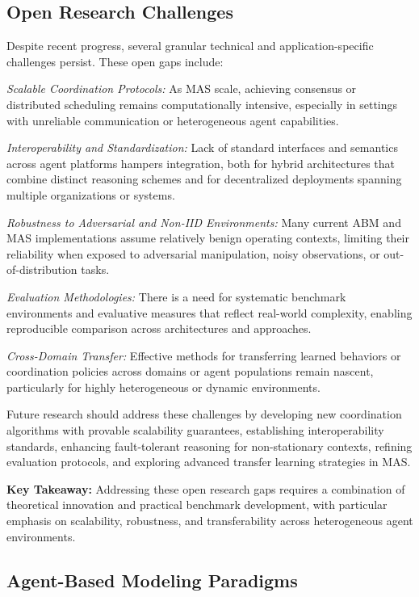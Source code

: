 \documentclass[sigconf]{acmart}
\begin{document}
\subsection{Open Research Challenges}

Despite recent progress, several granular technical and application-specific challenges persist. These open gaps include:

\textit{Scalable Coordination Protocols:} As MAS scale, achieving consensus or distributed scheduling remains computationally intensive, especially in settings with unreliable communication or heterogeneous agent capabilities.

\textit{Interoperability and Standardization:} Lack of standard interfaces and semantics across agent platforms hampers integration, both for hybrid architectures that combine distinct reasoning schemes and for decentralized deployments spanning multiple organizations or systems.

\textit{Robustness to Adversarial and Non-IID Environments:} Many current ABM and MAS implementations assume relatively benign operating contexts, limiting their reliability when exposed to adversarial manipulation, noisy observations, or out-of-distribution tasks.

\textit{Evaluation Methodologies:} There is a need for systematic benchmark environments and evaluative measures that reflect real-world complexity, enabling reproducible comparison across architectures and approaches.

\textit{Cross-Domain Transfer:} Effective methods for transferring learned behaviors or coordination policies across domains or agent populations remain nascent, particularly for highly heterogeneous or dynamic environments.

Future research should address these challenges by developing new coordination algorithms with provable scalability guarantees, establishing interoperability standards, enhancing fault-tolerant reasoning for non-stationary contexts, refining evaluation protocols, and exploring advanced transfer learning strategies in MAS.

\textbf{Key Takeaway:} Addressing these open research gaps requires a combination of theoretical innovation and practical benchmark development, with particular emphasis on scalability, robustness, and transferability across heterogeneous agent environments.

\subsection{Agent-Based Modeling Paradigms}
\end{document}
